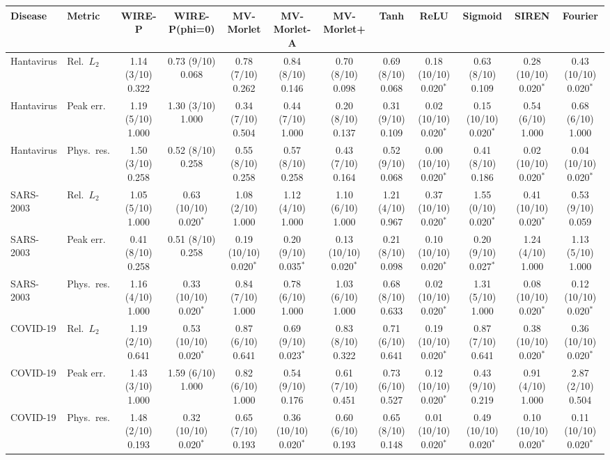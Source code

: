 \begin{tabular}{llcccccccccc}
\toprule
Disease & Metric & WIRE-P & WIRE-P(phi=0) & MV-Morlet & MV-Morlet-A & MV-Morlet+ & Tanh & ReLU & Sigmoid & SIREN & Fourier \\
\midrule
Hantavirus & Rel.\ $L_2$ & 1.14 (3/10) 0.322 & 0.73 (9/10) 0.068 & 0.78 (7/10) 0.262 & 0.84 (8/10) 0.146 & 0.70 (8/10) 0.098 & 0.69 (8/10) 0.068 & 0.18 (10/10) 0.020$^{*}$ & 0.63 (8/10) 0.109 & 0.28 (10/10) 0.020$^{*}$ & 0.43 (10/10) 0.020$^{*}$ \\
Hantavirus & Peak err. & 1.19 (5/10) 1.000 & 1.30 (3/10) 1.000 & 0.34 (7/10) 0.504 & 0.44 (7/10) 1.000 & 0.20 (8/10) 0.137 & 0.31 (9/10) 0.109 & 0.02 (10/10) 0.020$^{*}$ & 0.15 (10/10) 0.020$^{*}$ & 0.54 (6/10) 1.000 & 0.68 (6/10) 1.000 \\
Hantavirus & Phys.\ res. & 1.50 (3/10) 0.258 & 0.52 (8/10) 0.258 & 0.55 (8/10) 0.258 & 0.57 (8/10) 0.258 & 0.43 (7/10) 0.164 & 0.52 (9/10) 0.068 & 0.00 (10/10) 0.020$^{*}$ & 0.41 (8/10) 0.186 & 0.02 (10/10) 0.020$^{*}$ & 0.04 (10/10) 0.020$^{*}$ \\
\midrule
SARS-2003 & Rel.\ $L_2$ & 1.05 (5/10) 1.000 & 0.63 (10/10) 0.020$^{*}$ & 1.08 (2/10) 1.000 & 1.12 (4/10) 1.000 & 1.10 (6/10) 1.000 & 1.21 (4/10) 0.967 & 0.37 (10/10) 0.020$^{*}$ & 1.55 (0/10) 0.020$^{*}$ & 0.41 (10/10) 0.020$^{*}$ & 0.53 (9/10) 0.059 \\
SARS-2003 & Peak err. & 0.41 (8/10) 0.258 & 0.51 (8/10) 0.258 & 0.19 (10/10) 0.020$^{*}$ & 0.20 (9/10) 0.035$^{*}$ & 0.13 (10/10) 0.020$^{*}$ & 0.21 (8/10) 0.098 & 0.10 (10/10) 0.020$^{*}$ & 0.20 (9/10) 0.027$^{*}$ & 1.24 (4/10) 1.000 & 1.13 (5/10) 1.000 \\
SARS-2003 & Phys.\ res. & 1.16 (4/10) 1.000 & 0.33 (10/10) 0.020$^{*}$ & 0.84 (7/10) 1.000 & 0.78 (6/10) 1.000 & 1.03 (6/10) 1.000 & 0.68 (8/10) 0.633 & 0.02 (10/10) 0.020$^{*}$ & 1.31 (5/10) 1.000 & 0.08 (10/10) 0.020$^{*}$ & 0.12 (10/10) 0.020$^{*}$ \\
\midrule
COVID-19 & Rel.\ $L_2$ & 1.19 (2/10) 0.641 & 0.53 (10/10) 0.020$^{*}$ & 0.87 (6/10) 0.641 & 0.69 (9/10) 0.023$^{*}$ & 0.83 (8/10) 0.322 & 0.71 (6/10) 0.641 & 0.19 (10/10) 0.020$^{*}$ & 0.87 (7/10) 0.641 & 0.38 (10/10) 0.020$^{*}$ & 0.36 (10/10) 0.020$^{*}$ \\
COVID-19 & Peak err. & 1.43 (3/10) 1.000 & 1.59 (6/10) 1.000 & 0.82 (6/10) 1.000 & 0.54 (9/10) 0.176 & 0.61 (7/10) 0.451 & 0.73 (6/10) 0.527 & 0.12 (10/10) 0.020$^{*}$ & 0.43 (9/10) 0.219 & 0.91 (4/10) 1.000 & 2.87 (2/10) 0.504 \\
COVID-19 & Phys.\ res. & 1.48 (2/10) 0.193 & 0.32 (10/10) 0.020$^{*}$ & 0.65 (7/10) 0.193 & 0.36 (10/10) 0.020$^{*}$ & 0.60 (6/10) 0.193 & 0.65 (8/10) 0.148 & 0.01 (10/10) 0.020$^{*}$ & 0.49 (10/10) 0.020$^{*}$ & 0.10 (10/10) 0.020$^{*}$ & 0.11 (10/10) 0.020$^{*}$ \\
\bottomrule
\end{tabular}